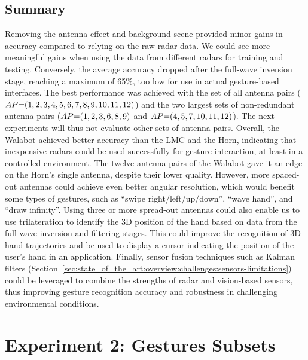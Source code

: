 \subsection{Summary}  \label{sec:radar-experiments:sensors:discussion}
Removing the antenna effect and background scene provided minor gains in accuracy compared to relying on the raw radar data. We could see more meaningful gains when using the data from different radars for training and testing.
%
Conversely, the average accuracy dropped after the full-wave inversion stage, reaching a maximum of 65\%, too low for use in actual gesture-based interfaces. 
%
The best performance was achieved with the set of all antenna pairs ($\splitatcommas{AP{=}(1, 2, 3, 4, 5, 6, 7, 8, 9, 10, 11, 12)}$) and the two largest sets of non-redundant antenna pairs ($\splitatcommas{AP{=}(1, 2, 3, 6, 8, 9)}$ and $\splitatcommas{AP{=}(4, 5, 7, 10, 11, 12)}$). The next experiments will thus not evaluate other sets of antenna pairs.
Overall, the Walabot achieved better accuracy than the LMC and the Horn, indicating that inexpensive radars could be used successfully for gesture interaction, at least in a controlled environment. 
The twelve antenna pairs of the Walabot gave it an edge on the Horn's single antenna, despite their lower quality. However, more spaced-out antennas could achieve even better angular resolution, which would benefit some types of gestures, such as ``swipe right/left/up/down'', ``wave hand'', and ``draw infinity''.
%
Using three or more spread-out antennas could also enable us to use trilateration to identify the 3D position of the hand based on data from the full-wave inversion and filtering stages. This could improve the recognition of 3D hand trajectories and be used to display a cursor indicating the position of the user's hand in an application.
%
Finally, sensor fusion techniques such as Kalman filters (Section~\ref{sec:state_of_the_art:overview:challenges:sensors-limitations}) could be leveraged to combine the strengths of radar and vision-based sensors, thus improving gesture recognition accuracy and robustness in challenging environmental conditions.



\section{Experiment 2: Gestures Subsets} \label{sec:radar-experiments:gesture-subsets}
